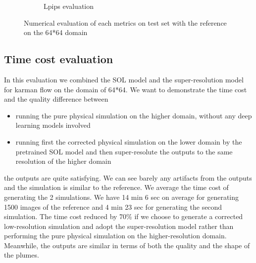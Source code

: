 \documentclass[a4paper,12pt,twoside]{report}
\begin{document}
\begin{figure}
\begin{subfigure}{0.32\textwidth}
			\caption{Lpips evaluation}
		\end{subfigure}
		\caption{Numerical evaluation of each metrics on test set with the reference on the 64*64 domain}
	\end{figure}

\subsection{Time cost evaluation}
In this evaluation we combined the SOL model and the super-resolution model for karman flow on the domain of 64*64. We want to demonstrate the time cost and the quality difference between
\begin{itemize}
	\item running  the pure physical simulation on the higher domain, without any deep learning models involved
	\item running first the corrected physical simulation on the lower domain by the pretrained SOL model and then super-resolute the outputs to the same resolution of the higher domain 
\end{itemize}
the outputs are quite satisfying. We can see barely any artifacts from the outputs and the simulation is similar to the reference. We average the time cost of generating the 2 simulations. We have 14 min 6 sec on average for generating 1500 images of the reference and 4 min 23 sec for generating the second simulation. The time cost reduced by 70\% if we choose to generate a corrected low-resolution simulation and adopt the super-resolution model rather than performing the pure physical simulation on the higher-resolution domain. Meanwhile, the outputs are similar in terms of both the quality and the shape of the plumes.  
\end{document}
